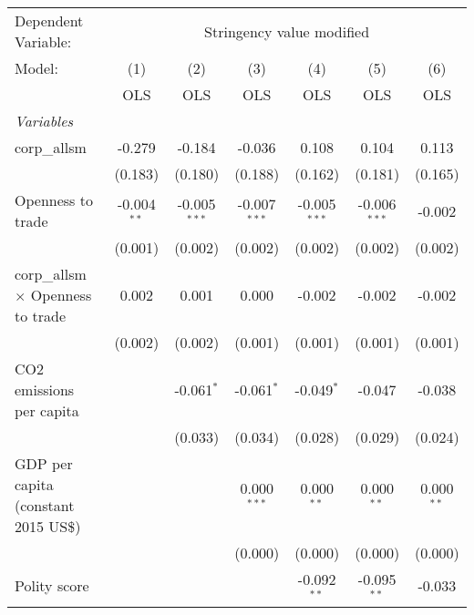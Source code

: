 
\begingroup
\centering
\begin{tabular}{lcccccc}
   \toprule
   Dependent Variable: & \multicolumn{6}{c}{Stringency value modified}\\
   Model:                                   & (1)           & (2)            & (3)            & (4)            & (5)            & (6)\\  
                                            &  OLS          & OLS            & OLS            & OLS            & OLS            & OLS\\  
   \midrule
   \emph{Variables}\\
   corp\_allsm                              & -0.279        & -0.184         & -0.036         & 0.108          & 0.104          & 0.113\\   
                                            & (0.183)       & (0.180)        & (0.188)        & (0.162)        & (0.181)        & (0.165)\\   
   Openness to trade                        & -0.004$^{**}$ & -0.005$^{***}$ & -0.007$^{***}$ & -0.005$^{***}$ & -0.006$^{***}$ & -0.002\\   
                                            & (0.001)       & (0.002)        & (0.002)        & (0.002)        & (0.002)        & (0.002)\\   
   corp\_allsm $\times$ Openness to trade   & 0.002         & 0.001          & 0.000          & -0.002         & -0.002         & -0.002\\   
                                            & (0.002)       & (0.002)        & (0.001)        & (0.001)        & (0.001)        & (0.001)\\   
   CO2 emissions per capita                 &               & -0.061$^{*}$   & -0.061$^{*}$   & -0.049$^{*}$   & -0.047         & -0.038\\   
                                            &               & (0.033)        & (0.034)        & (0.028)        & (0.029)        & (0.024)\\   
   GDP per capita (constant 2015 US\$)      &               &                & 0.000$^{***}$  & 0.000$^{**}$   & 0.000$^{**}$   & 0.000$^{**}$\\   
                                            &               &                & (0.000)        & (0.000)        & (0.000)        & (0.000)\\   
   Polity score                             &               &                &                & -0.092$^{**}$  & -0.095$^{**}$  & -0.033\\   

\end{tabular}
